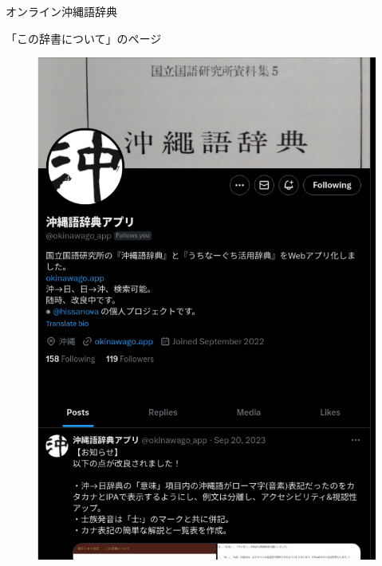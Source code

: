 \documentclass[14pt]{beamer}
\begin{document}
\begin{frame}{オンライン沖縄語辞典}
\begin{block}{「この辞書について」のページ}
\begin{figure}[ht]
\begin{minipage}{0.4\textwidth}
        \includegraphics[height=0.4\paperheight]{okinawago-app-twitter-account.png}
      \end{minipage}
    \end{figure}
  \end{block}
\end{frame}
\end{document}
